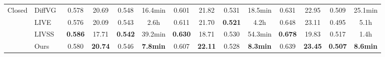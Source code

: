 \begin{table}[!t]
{\begin{tabular}{l|l|cccc|cccc|cccc}
\multirow{4}{*}{Closed} 
& DiffVG~\cite{Li:2020:DVG}
  & \cellcolor{baselinegray}0.578 & \cellcolor{baselinegray}20.69 & \cellcolor{baselinegray}0.548 & \cellcolor{timegray}16.4min
  & \cellcolor{baselinegray}0.601 & \cellcolor{baselinegray}21.82 & \cellcolor{baselinegray}0.531 & \cellcolor{timegray}18.5min
  & \cellcolor{baselinegray}0.631 & \cellcolor{baselinegray}22.95 & \cellcolor{baselinegray}0.509 & \cellcolor{timegray}25.1min \\
& LIVE~\cite{xu2022live} 
  & \cellcolor{baselinegray}0.576 & \cellcolor{baselinegray}20.09 & \cellcolor{baselinegray}0.543 & \cellcolor{timegray}2.6h
  & \cellcolor{baselinegray}0.611 & \cellcolor{baselinegray}21.70 & \cellcolor{baselinegray}\textbf{0.521} & \cellcolor{timegray}4.2h
  & \cellcolor{baselinegray}0.648 & \cellcolor{baselinegray}23.11 & \cellcolor{baselinegray}0.495 & \cellcolor{timegray}5.1h \\
& LIVSS~\cite{livss} 
  & \cellcolor{baselinegray}\textbf{0.586} & \cellcolor{baselinegray}17.71 & \cellcolor{baselinegray}\textbf{0.542} & \cellcolor{timegray}39.2min
  & \cellcolor{baselinegray}\textbf{0.630} & \cellcolor{baselinegray}18.71 & \cellcolor{baselinegray}0.530 & \cellcolor{timegray}54.3min
  & \cellcolor{baselinegray}\textbf{0.678} & \cellcolor{baselinegray}19.83 & \cellcolor{baselinegray}0.517 & \cellcolor{timegray}1.4h \\
& Ours 
  & \cellcolor{oursblue}0.580 & \cellcolor{oursblue}\textbf{20.74} & \cellcolor{oursblue}0.546 & \cellcolor{timegray}\textbf{7.8min}
  & \cellcolor{oursblue}0.607 & \cellcolor{oursblue}\textbf{22.11} & \cellcolor{oursblue}0.528 & \cellcolor{timegray}\textbf{8.3min}
  & \cellcolor{oursblue}0.639 & \cellcolor{oursblue}\textbf{23.45} & \cellcolor{oursblue}\textbf{0.507} & \cellcolor{timegray}\textbf{8.6min} \\
\hline
\end{tabular}
}
\end{table}




                        
